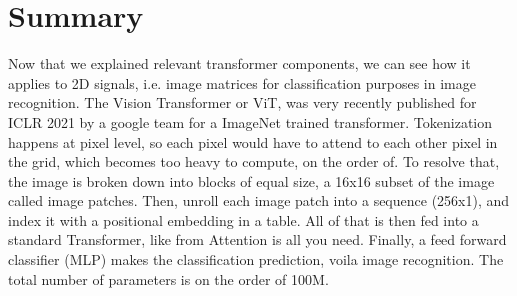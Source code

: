 \documentclass[pdftex,11pt,titlepage,twoside,openright]{report}
\begin{document}
\cleardoublepage
\chapter{Summary}

Now that we explained relevant transformer components, we can see how it applies to 2D signals, i.e. image matrices for classification purposes in image recognition.
The Vision Transformer or ViT, was very recently published for ICLR 2021 by a google team for a ImageNet trained transformer.
Tokenization happens at pixel level, so each pixel would have to attend to  each other pixel in the grid, which becomes too heavy to compute, on the order of. 
To resolve that, the image is broken down into blocks of equal size, a 16x16 subset of the image called image patches. Then, unroll each image patch into a sequence (256x1), and index it with a positional embedding in a table. All of that is then fed into a standard Transformer, like from Attention is all you need. Finally, a feed forward classifier (MLP) makes the classification prediction, voila image recognition.
The total number of parameters is on the order of 100M.

\newpage



\cleardoublepage
{} %
\pagestyle{plain}






\cleardoublepage
{} %
\pagestyle{plain}

\end{document}
